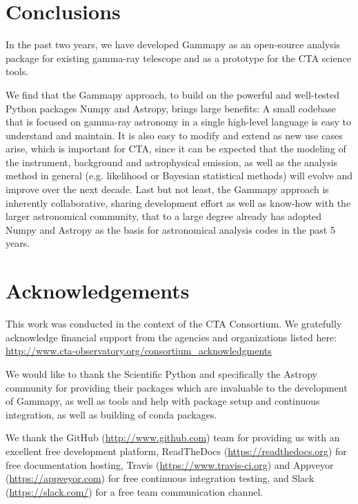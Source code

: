 \documentclass{PoS}
\newcommand{\url}[1]{\href{#1}{#1}}
\begin{document}
\section{Conclusions}
\label{sec:conclusions}

In the past two years, we have developed Gammapy as an open-source analysis
package for existing gamma-ray telescope and as a prototype for the CTA science
tools.

We find that the Gammapy approach, to build on the powerful and well-tested
Python packages Numpy and Astropy, brings large benefits: A small codebase that
is focused on gamma-ray astronomy in a single high-level language is easy to
understand and maintain. It is also easy to modify and extend as new use cases
arise, which is important for CTA, since it can be expected that the modeling of
the instrument, background and astrophysical emission, as well as the analysis
method in general (e.g. likelihood or Bayesian statistical methods) will evolve
and improve over the next decade. Last but not least, the Gammapy approach is
inherently collaborative, sharing development effort as well as know-how with
the larger astronomical community, that to a large degree already has adopted
Numpy and Astropy as the basis for astronomical analysis codes in the past 5
years.

\section{Acknowledgements}
\label{sed:acknowledgements}

This work was conducted in the context of the CTA Consortium. We gratefully
acknowledge financial support from the agencies and organizations listed here:
\url{http://www.cta-observatory.org/consortium\_acknowledgments}

We would like to thank the Scientific Python and specifically the Astropy
community for providing their packages which are invaluable to the development
of Gammapy, as well as tools and help with package setup and continuous
integration, as well as building of conda packages.

We thank the GitHub (\url{http://www.github.com}) team for providing us with an
excellent free development platform, ReadTheDocs (\url{https://readthedocs.org})
for free documentation hosting, Travis (\url{https://www.travis-ci.org}) and
Appveyor (\url{https://appveyor.com}) for free continuous integration testing,
and Slack (\url{https://slack.com/}) for a free team communication channel.




\end{document}
